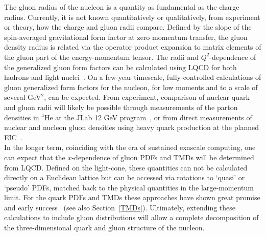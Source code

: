 The gluon radius of the nucleon is a quantity as fundamental as the charge radius. Currently, it is not known quantitatively or qualitatively, from experiment or theory, how the charge and gluon radii compare. 
Defined by the slope of the spin-averaged gravitational form factor at zero momentum transfer, the gluon density radius is related via the operator product expansion to matrix elements of the gluon part of the energy-momentum tensor.
The radii and $Q^2$-dependence of the generalized gluon form factors can be calculated using LQCD for both hadrons and light nuclei~\cite{Detmold:2017oqb,Winter:2017bfs}.
On a few-year timescale, fully-controlled calculations of gluon generalized form factors for the nucleon, for low moments and to a scale of several GeV$^2$, can be expected.
From experiment, comparison of nuclear quark and gluon radii will likely be possible through measurements of the parton densities in ${}^4$He at the JLab 12 GeV program~\cite{Hattawy:2017woc}, or from direct measurements of nuclear and nucleon gluon densities using heavy quark production at the planned EIC~\cite{Chudakov:2016otl}. \\


In the longer term, coinciding with the era of sustained exascale computing, one can expect that the $x$-dependence of gluon PDFs and TMDs will be determined from LQCD. Defined on the light-cone, these quantities can not be calculated directly on a Euclidean lattice but can be accessed via rotations to `quasi' or `pseudo' PDFs, matched back to the physical quantities in the large-momentum limit. For the quark PDFs and TMDs these approaches have shown great promise and early success~\cite{Lin:2014zya,Alexandrou:2015rja} (see also Section~\ref{TMDs}). Ultimately, extending these calculations to include gluon distributions will allow a complete decomposition of the three-dimensional quark and gluon structure of the nucleon. 

